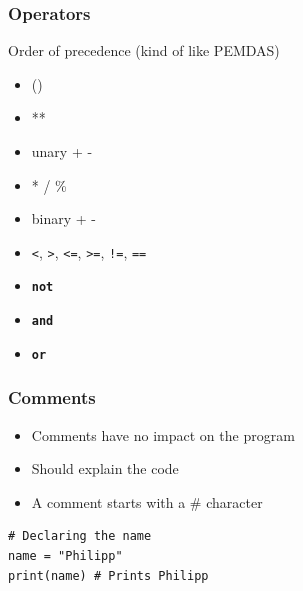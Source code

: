 \documentclass[10pt, a4paper]{beamer} %
\begin{document}
\begin{frame}[t, fragile]\frametitle{Operators}
\begin{block}{Order of precedence (kind of like PEMDAS)}
\begin{itemize}
        \item ()
        \item **
        \item unary + -
        \item *  /  \%
        \item binary + -
        \item \texttt{<}, \texttt{>}, \texttt{<=}, \texttt{>=}, \texttt{!=}, \texttt{==}
        \item \textbf{\texttt{\color{mDarkBlue}not}}
        \item \textbf{\texttt{\color{mDarkBlue}and}}
        \item \textbf{\texttt{\color{mDarkBlue}or}}
    \end{itemize}    
\end{block}
    
\end{frame}

\begin{frame}[c, fragile]\frametitle{Comments}
\begin{itemize}
    \item Comments have no impact on the program
    \item Should explain the code
    \item A comment starts with a \# character
\end{itemize}

\begin{examples}
    \begin{lstlisting}
# Declaring the name
name = "Philipp"
print(name) # Prints Philipp
    \end{lstlisting}
\end{examples}
    


\end{frame}

\end{document}
